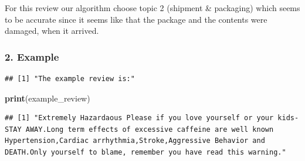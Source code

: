 \documentclass[
]{article}
\newenvironment{Shaded}{\begin{snugshade}}{\end{snugshade}}
\newcommand{\CommentTok}[1]{\textcolor[rgb]{0.56,0.35,0.01}{\textit{#1}}}
\newcommand{\DecValTok}[1]{\textcolor[rgb]{0.00,0.00,0.81}{#1}}
\newcommand{\FloatTok}[1]{\textcolor[rgb]{0.00,0.00,0.81}{#1}}
\newcommand{\FunctionTok}[1]{\textcolor[rgb]{0.13,0.29,0.53}{\textbf{#1}}}
\newcommand{\NormalTok}[1]{#1}
\newcommand{\OtherTok}[1]{\textcolor[rgb]{0.56,0.35,0.01}{#1}}
\newcommand{\SpecialCharTok}[1]{\textcolor[rgb]{0.81,0.36,0.00}{\textbf{#1}}}
\newcommand{\StringTok}[1]{\textcolor[rgb]{0.31,0.60,0.02}{#1}}
\begin{document}
For this review our algorithm choose topic 2 (shipment \& packaging)
which seems to be accurate since it seems like that the package and the
contents were damaged, when it arrived.

\hypertarget{example-1}{%
\subsubsection{2. Example}\label{example-1}}

\begin{Shaded}
\end{Shaded}

\begin{verbatim}
## [1] "The example review is:"
\end{verbatim}

\begin{Shaded}
\begin{Highlighting}[]
\FunctionTok{print}\NormalTok{(example\_review)}
\end{Highlighting}
\end{Shaded}

\begin{verbatim}
## [1] "Extremely Hazardaous Please if you love yourself or your kids-STAY AWAY.Long term effects of excessive caffeine are well known Hypertension,Cardiac arrhythmia,Stroke,Aggressive Behavior and DEATH.Only yourself to blame, remember you have read this warning."
\end{verbatim}

\begin{Shaded}
\end{Shaded}
\end{document}
